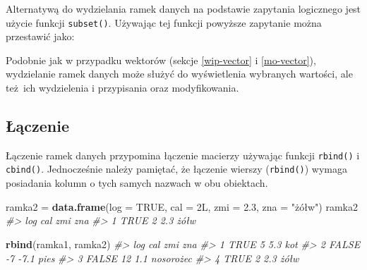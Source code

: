 \documentclass[paper=6in:9in,pagesize=pdftex,headinclude=on,footinclude=on,10pt]{scrbook}
\makeatletter
\newenvironment{Shaded}{\begin{snugshade}}{\end{snugshade}}
\newcommand{\CommentTok}[1]{\textcolor[rgb]{0.56,0.35,0.01}{\textit{#1}}}
\newcommand{\DataTypeTok}[1]{\textcolor[rgb]{0.13,0.29,0.53}{#1}}
\newcommand{\FloatTok}[1]{\textcolor[rgb]{0.00,0.00,0.81}{#1}}
\newcommand{\KeywordTok}[1]{\textcolor[rgb]{0.13,0.29,0.53}{\textbf{#1}}}
\newcommand{\NormalTok}[1]{#1}
\newcommand{\OperatorTok}[1]{\textcolor[rgb]{0.81,0.36,0.00}{\textbf{#1}}}
\newcommand{\OtherTok}[1]{\textcolor[rgb]{0.56,0.35,0.01}{#1}}
\newcommand{\StringTok}[1]{\textcolor[rgb]{0.31,0.60,0.02}{#1}}
\newenvironment{kframe}{%
\medskip{}
\setlength{\fboxsep}{.8em}
 \def\at@end@of@kframe{}%
 \ifinner\ifhmode%
  \def\at@end@of@kframe{\end{minipage}}%
  \begin{minipage}{\columnwidth}%
 \fi\fi%
 \def\FrameCommand##1{\hskip\@totalleftmargin \hskip-\fboxsep
 \colorbox{shadecolor}{##1}\hskip-\fboxsep
     \hskip-\linewidth \hskip-\@totalleftmargin \hskip\columnwidth}%
 \MakeFramed {\advance\hsize-\width
   \@totalleftmargin\z@ \linewidth\hsize
   \@setminipage}}%
 {\par\unskip\endMakeFramed%
 \at@end@of@kframe}
\newenvironment{rmdblock}[1]
  {
  \begin{itemize}
  \renewcommand{\labelitemi}{
    \raisebox{-.7\height}[0pt][0pt]{
      {\setkeys{Gin}{width=3em,keepaspectratio}\texttt{[image: images/\#1]}}
    }
  }
  \setlength{\fboxsep}{1em}
  \begin{kframe}
  \item
  }
  {
  \end{kframe}
  \end{itemize}
  }
\newenvironment{rmdinfo}
  {\begin{rmdblock}{compass}}
  {\end{rmdblock}}
\makeatother
\begin{document}
Alternatywą do wydzielania ramek danych na podstawie zapytania logicznego jest użycie funkcji \texttt{subset()}.
Używając tej funkcji powyższe zapytanie można przestawić jako:

\begin{Shaded}
\end{Shaded}

\begin{rmdinfo}
\begin{rmdinfo}

Podobnie jak w przypadku wektorów (sekcje \ref{wip-vector} i \ref{mo-vector}), wydzielanie ramek danych może służyć do wyświetlenia wybranych wartości, ale też~ich wydzielenia i przypisania oraz modyfikowania.

\end{rmdinfo}
\end{rmdinfo}

\hypertarget{ux142ux105czenie-1}{%
\subsection{Łączenie}\label{ux142ux105czenie-1}}

Łączenie ramek danych przypomina łączenie macierzy używając funkcji \texttt{rbind()} i \texttt{cbind()}.
Jednocześnie należy pamiętać, że łączenie wierszy (\texttt{rbind()}) wymaga posiadania kolumn o tych samych nazwach w obu obiektach.

\begin{Shaded}
\begin{Highlighting}[]
\NormalTok{ramka2 =}\StringTok{ }\KeywordTok{data.frame}\NormalTok{(}\DataTypeTok{log =} \OtherTok{TRUE}\NormalTok{, }\DataTypeTok{cal =}\NormalTok{ 2L, }\DataTypeTok{zmi =} \FloatTok{2.3}\NormalTok{, }\DataTypeTok{zna =} \StringTok{"żółw"}\NormalTok{)}
\NormalTok{ramka2}
\CommentTok{#>    log cal zmi  zna}
\CommentTok{#> 1 TRUE   2 2.3 żółw}

\KeywordTok{rbind}\NormalTok{(ramka1, ramka2)}
\CommentTok{#>     log cal  zmi       zna}
\CommentTok{#> 1  TRUE   5  5.3       kot}
\CommentTok{#> 2 FALSE  -7 -7.1      pies}
\CommentTok{#> 3 FALSE  12  1.1 nosorożec}
\CommentTok{#> 4  TRUE   2  2.3      żółw}
\end{Highlighting}
\end{Shaded}
\end{document}
